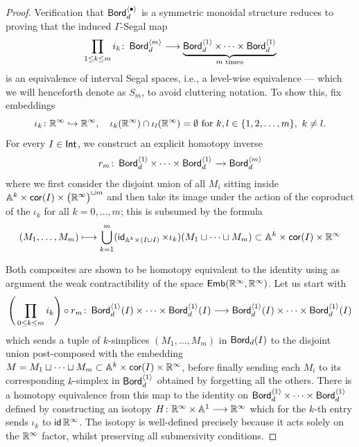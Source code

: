 \begin{proof}

    Verification that $\operatorname{\mathsf{Bord}}_{d}^{\langle \bullet \rangle}$ is a symmetric monoidal structure reduces to proving that the induced $\Gamma$-Segal map
    \begin{equation}
        \prod_{1 \leq k \leq m} i_k \colon \operatorname{\mathsf{Bord}}_{d}^{\langle m \rangle} \longrightarrow \underbrace{\operatorname{\mathsf{Bord}}_{d}^{\langle 1 \rangle} \times \cdots \times \operatorname{\mathsf{Bord}}_{d}^{\langle 1 \rangle}}_{m \text{ times}}
    \end{equation}
    is an equivalence of interval Segal spaces, i.e., a level-wise equivalence — which we will henceforth denote as $S_m$, to avoid cluttering notation. To show this, fix embeddings
    \begin{equation}
        \iota_k \colon \mathbb R^{\operatorname{\infty}} \hookrightarrow \mathbb R^{\operatorname{\infty}}, \quad \iota_k(\mathbb R^{\operatorname{\infty}}) \cap \iota_l(\mathbb R^{\operatorname{\infty}}) = \emptyset \mbox{ for } k, l \in \{ 1, 2, \ldots, m \}, \, \, k \neq l .
    \end{equation}
    For every $I\in \operatorname{\mathsf{Int}}$, we construct an explicit homotopy inverse
    \begin{equation}
        r_{m} \colon \operatorname{\mathsf{Bord}}_{d}^{\langle 1 \rangle} \times \cdots \times \operatorname{\mathsf{Bord}}_{d}^{\langle 1 \rangle} \xrightarrow{\,\,\,\,} \operatorname{\mathsf{Bord}}_{d}^{\langle m \rangle}
    \end{equation}
    where we first consider the disjoint union of all $M_i$ sitting inside $\mathbb A^{k}\times \mathsf{cor}(I)\times \big(\mathbb R^{\operatorname{\infty}}\big)^{\sqcup m}$ and then take its image under the action of the coproduct of the $\iota_k$ for all $k=0,\ldots,m$; this is subsumed by the formula
    \begin{equation}
        (M_1,\ldots, M_m) \longmapsto \bigcup_{k = 1}^{m}(\operatorname{\sf id}_{\mathbb A^k\times (I \cup I)}\times \iota_k)(M_1\sqcup \cdots \sqcup M_m) \subset \mathbb A^k \times \mathsf{cor}(I)\times \mathbb R^{\operatorname{\infty}}
    \end{equation}
    
    Both composites are shown to be homotopy equivalent to the identity using as argument the weak contractibility of the space $\operatorname{\mathsf{Emb}}(\mathbb R^{\operatorname{\infty}},\mathbb R^{\operatorname{\infty}})$. Let us start with 
    \begin{equation}
         \Bigg(\prod_{0\leq k \leq m} i_k \Bigg)  \circ r_{m} \colon \operatorname{\mathsf{Bord}}_{d}^{\langle 1 \rangle}(I) \times \cdots \times \operatorname{\mathsf{Bord}}_{d}^{\langle 1 \rangle}(I) \longrightarrow \operatorname{\mathsf{Bord}}_{d}^{\langle 1 \rangle}(I) \times \cdots \times \operatorname{\mathsf{Bord}}_{d}^{\langle 1 \rangle}(I)  
    \end{equation}
    which sends a tuple of $k$-simplices $(M_1,\ldots,M_m)$ in $\operatorname{\mathsf{Bord}}_d(I)$ to the disjoint union post-composed with the embedding $M = M_1 \sqcup \cdots \sqcup M_m \subset \mathbb A^{k}\times \mathsf{cor}(I)\times \mathbb R^{\operatorname{\infty}}$, before finally sending each $M_i$ to its corresponding $k$-simplex in $\operatorname{\mathsf{Bord}}_d^{\langle 1 \rangle}$ obtained by forgetting all the others. There is a homotopy equivalence from this map to the identity on $\operatorname{\mathsf{Bord}}_{d}^{\langle 1 \rangle} \times \cdots \times \operatorname{\mathsf{Bord}}_{d}^{\langle 1 \rangle}$ defined by constructing an isotopy $H\colon \mathbb R^{\operatorname{\infty}}\times \mathbb A^1 \longrightarrow \mathbb R^{\operatorname{\infty}}$ which for the $k$-th entry sends $\iota_k$ to $\operatorname{\sf id}{\mathbb R^{\operatorname{\infty}}}$. The isotopy is well-defined precisely because it acts solely on the $\mathbb R^{\operatorname{\infty}}$ factor, whilst preserving all submersivity conditions.


\end{proof}
